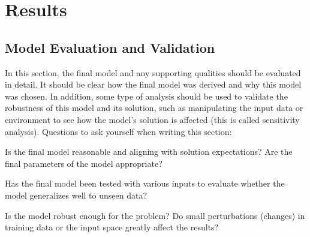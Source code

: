 \documentclass[12pt,journal,compsoc]{IEEEtran}
\begin{document}







\section{Results} %
\subsection{Model Evaluation and Validation}\label{sec:eval}
In this section, the final model and any supporting qualities should be evaluated in detail. It should be clear how the final model was derived and why this model was chosen. In addition, some type of analysis should be used to validate the robustness of this model and its solution, such as manipulating the input data or environment to see how the model’s solution is affected (this is called sensitivity analysis). Questions to ask yourself when writing this section:

Is the final model reasonable and aligning with solution expectations? Are the final parameters of the model appropriate?

Has the final model been tested with various inputs to evaluate whether the model generalizes well to unseen data?

Is the model robust enough for the problem? Do small perturbations (changes) in training data or the input space greatly affect the results?
\end{document}
